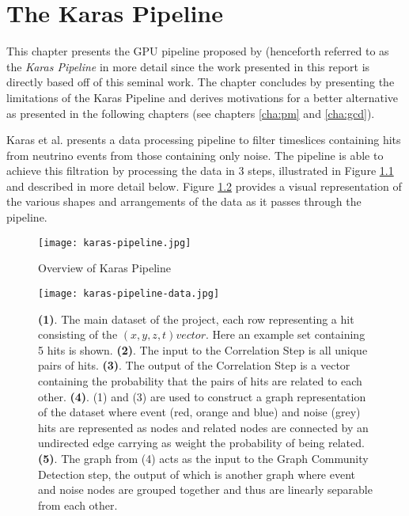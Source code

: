 \chapter{The Karas Pipeline}
\label{cha:karas-pipeline}

This chapter presents the GPU pipeline proposed by
\cite{karas2019data} (henceforth referred to as the \textit{Karas
  Pipeline} in more detail since the work presented in this report is
directly based off of this seminal work. The chapter concludes by
presenting the limitations of the Karas Pipeline and derives
motivations for a better alternative as presented in the following
chapters (see chapters \ref{cha:pm} and \ref{cha:gcd}).

Karas et al. presents a data processing pipeline to filter timeslices
containing hits from neutrino events from those containing only noise.
The pipeline is able to achieve this filtration by processing the data
in 3 steps, illustrated in Figure \ref{fig:karas-pipeline} and
described in more detail below. Figure \ref{fig:karas-pipeline-data}
provides a visual representation of the various shapes and
arrangements of the data as it passes through the pipeline.

\begin{figure}[h]
  \centering
  \texttt{[image: karas-pipeline.jpg]}
  \caption{Overview of Karas Pipeline}
  \label{fig:karas-pipeline}
\end{figure}

\begin{figure}[h]
  \centering
  \texttt{[image: karas-pipeline-data.jpg]}
  \caption{\textbf{(1)}. The main dataset of the project, each row
    representing a hit consisting of the $(x, y, z, t) vector$. Here
    an example set containing 5 hits is shown. \textbf{(2)}. The input
    to the Correlation Step is all unique pairs of hits. \textbf{(3)}.
    The output of the Correlation Step is a vector containing the
    probability that the pairs of hits are related to each other.
    \textbf{(4)}. (1) and (3) are used to construct a graph
    representation of the dataset where event (red, orange and blue)
    and noise (grey) hits are represented as nodes and related nodes
    are connected by an undirected edge carrying as weight the
    probability of being related. \textbf{(5)}. The graph from (4)
    acts as the input to the Graph Community Detection step, the
    output of which is another graph where event and noise nodes are
    grouped together and thus are linearly separable from each other.}
  \label{fig:karas-pipeline-data}
\end{figure}

